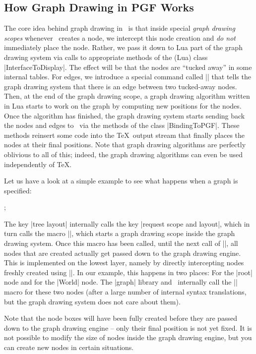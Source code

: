 \subsection{How Graph Drawing in PGF Works}

The core idea behind graph drawing in \pgfname\ is that inside special
\emph{graph drawing scopes} whenever \pgfname\ creates a node, we intercept
this node creation and \emph{do not} immediately place the node. Rather, we
pass it down to Lua part of the graph drawing system via calls to appropriate
methods of the (Lua) class |InterfaceToDisplay|. The effect will be that the
nodes are ``tucked away'' in some internal tables. For edges, we introduce a
special command called |\pgfgdedge| that tells the graph drawing system that
there is an edge between two tucked-away nodes. Then, at the end of the graph
drawing scope, a graph drawing algorithm written in Lua starts to work on the
graph by computing new positions for the nodes. Once the algorithm has
finished, the graph drawing system starts sending back the nodes and edges to
\pgfname\ via the methods of the class |BindingToPGF|. These methods reinsert
some code into the \TeX\ output stream that finally places the nodes at their
final positions. Note that graph drawing algorithms are perfectly oblivious to
all of this; indeed, the graph drawing algorithms can even be used
independently of \TeX.

Let us have a look at a simple example to see what happens when a graph is
specified:
%
\begin{codeexample}[]
  ;
\end{codeexample}

The key |tree layout| internally calls the key |request scope and layout|,
which in turn calls the macro |\pgfgdbeginscope|, which starts a graph drawing
scope inside the graph drawing system. Once this macro has been called, until
the next call of |\pgfgdendscope|, all nodes that are created actually get
passed down to the graph drawing engine. This is implemented on the lowest
layer, namely by directly intercepting nodes freshly created using |\pgfnode|.
In our example, this happens in two places: For the |root| node and for the
|World| node. The |graph| library and \tikzname\ internally call the |\pgfnode|
macro for these two nodes (after a large number of internal syntax
translations, but the graph drawing system does not care about them).

Note that the node boxes will have been fully created before they are passed
down to the graph drawing engine -- only their final position is not yet fixed.
It is not possible to modify the size of nodes inside the graph drawing engine,
but you can create new nodes in certain situations.


